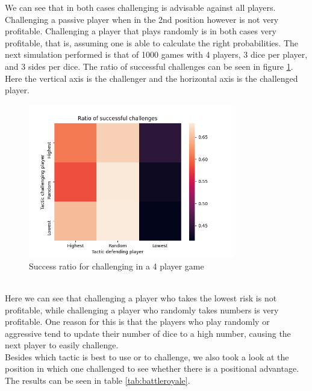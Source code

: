 \documentclass{article}
\begin{document}
We can see that in both cases challenging is advisable against all players. Challenging a passive player when in the 2nd position however is not very profitable. Challenging a player that plays randomly is in both cases very profitable, that is, assuming one is able to calculate the right probabilities. 
The next simulation performed is that of 1000 games with 4 players, 3 dice per player, and 3 sides per dice. The ratio of successful challenges can be seen in figure \ref{fig:success4player}. Here the vertical axis is the challenger and the horizontal axis is the challenged player. 
\begin{figure}
    \centering
    \includegraphics[width=0.8\textwidth]{img/ratio4players.png}
    \caption{Success ratio for challenging in a 4 player game}
    \label{fig:success4player}
\end{figure}\\
Here we can see that challenging a player who takes the lowest risk is not profitable, while challenging a player who randomly takes numbers is very profitable. One reason for this is that the players who play randomly or aggressive tend to update their number of dice to a high number, causing the next player to easily challenge.\\
Besides which tactic is best to use or to challenge, we also took a look at the position in which one challenged to see whether there is a positional advantage. The results can be seen in table \ref{tab:battleroyale}.  
\end{document}
